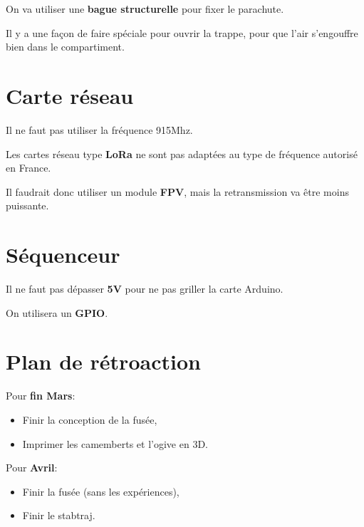 \documentclass[6pt,a4paper]{article}
\begin{document}
On va utiliser une \textbf{bague structurelle} pour fixer le parachute.

\vspace{1\baselineskip}

Il y a une façon de faire spéciale pour ouvrir la trappe, pour que l'air s'engouffre bien dans le compartiment.

\vspace{1\baselineskip}

\section{\large Carte réseau}

\vspace{1\baselineskip}

Il ne faut pas utiliser la fréquence 915Mhz.

Les cartes réseau type \textbf{LoRa} ne sont pas adaptées au type de fréquence autorisé en France.

\vspace{1\baselineskip}

Il faudrait donc utiliser un module \textbf{FPV}, mais la retransmission va être moins puissante.

\vspace{1\baselineskip}

\section{\large Séquenceur}

\vspace{1\baselineskip}

Il ne faut pas dépasser \textbf{5V} pour ne pas griller la carte Arduino.

On utilisera un \textbf{GPIO}.

\vspace{1\baselineskip}

\section{\large Plan de rétroaction}

\vspace{1\baselineskip}

Pour \textbf{fin Mars}:
\begin{itemize}
	\item Finir la conception de la fusée,
	\item Imprimer les camemberts et l'ogive en 3D.
\end{itemize}

\vspace{1\baselineskip}

Pour \textbf{Avril}:
\begin{itemize}
	\item Finir la fusée (sans les expériences),
	\item Finir le stabtraj.
\end{itemize}
\end{document}
